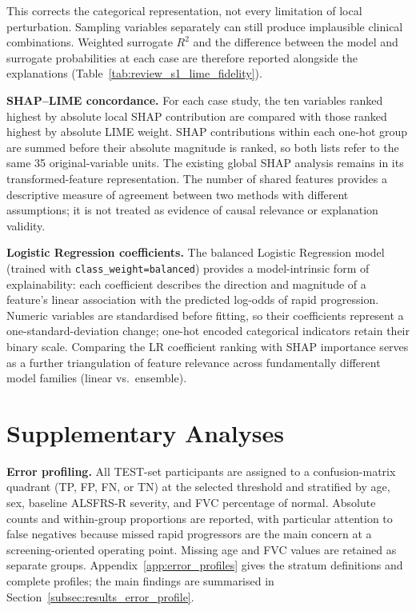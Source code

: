 This corrects the categorical representation, not every limitation of local perturbation. Sampling variables separately can still produce implausible clinical combinations. Weighted surrogate $R^2$ and the difference between the model and surrogate probabilities at each case are therefore reported alongside the explanations (Table~\ref{tab:review_s1_lime_fidelity}).

\label{subsec:methods_concordance}
\noindent\textbf{SHAP--LIME concordance.}
For each case study, the ten variables ranked highest by absolute local \gls{SHAP} contribution are compared with those ranked highest by absolute \gls{LIME} weight. SHAP contributions within each one-hot group are summed before their absolute magnitude is ranked, so both lists refer to the same 35 original-variable units. The existing global SHAP analysis remains in its transformed-feature representation.
The number of shared features provides a descriptive measure of agreement between two methods with different assumptions; it is not treated as evidence of causal relevance or explanation validity.

\label{subsec:methods_lr_coefs}
\noindent\textbf{Logistic Regression coefficients.}
The balanced Logistic Regression model (trained with \texttt{class\_weight=balanced}) provides a model-intrinsic form of explainability:
each coefficient describes the direction and magnitude of a feature's linear association with the predicted log-odds of rapid progression.
Numeric variables are standardised before fitting, so their coefficients represent a one-standard-deviation change; one-hot encoded categorical indicators retain their binary scale.
Comparing the \gls{LR} coefficient ranking with \gls{SHAP} importance serves as a further triangulation of feature relevance across fundamentally different model families (linear vs.\ ensemble).

\section{Supplementary Analyses}
\label{sec:methods_supplementary}

\noindent\textbf{Error profiling.}
All \gls{TEST}-set participants are assigned to a confusion-matrix quadrant (\gls{TP}, \gls{FP}, \gls{FN}, or \gls{TN}) at the selected threshold and stratified by age, sex, baseline \gls{ALSFRS-R} severity, and \gls{FVC} percentage of normal. Absolute counts and within-group proportions are reported, with particular attention to false negatives because missed rapid progressors are the main concern at a screening-oriented operating point. Missing age and \gls{FVC} values are retained as separate groups. Appendix~\ref{app:error_profiles} gives the stratum definitions and complete profiles; the main findings are summarised in Section~\ref{subsec:results_error_profile}.

